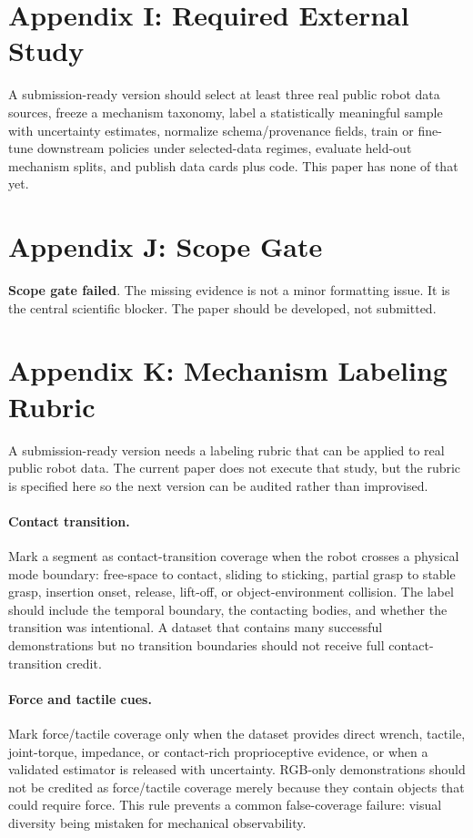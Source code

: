 \documentclass{article}
\newcommand{\todoexternal}{\textbf{Scope gate failed}}
\begin{document}
\section{Appendix I: Required External Study}
A submission-ready version should select at least three real public robot data sources, freeze a mechanism taxonomy, label a statistically meaningful sample with uncertainty estimates, normalize schema/provenance fields, train or fine-tune downstream policies under selected-data regimes, evaluate held-out mechanism splits, and publish data cards plus code. This paper has none of that yet.

\section{Appendix J: Scope Gate}
\todoexternal{}. The missing evidence is not a minor formatting issue. It is the central scientific blocker. The paper should be developed, not submitted.

\section{Appendix K: Mechanism Labeling Rubric}
A submission-ready version needs a labeling rubric that can be applied to real public robot data. The current paper does not execute that study, but the rubric is specified here so the next version can be audited rather than improvised.

\paragraph{Contact transition.}
Mark a segment as contact-transition coverage when the robot crosses a physical mode boundary: free-space to contact, sliding to sticking, partial grasp to stable grasp, insertion onset, release, lift-off, or object-environment collision. The label should include the temporal boundary, the contacting bodies, and whether the transition was intentional. A dataset that contains many successful demonstrations but no transition boundaries should not receive full contact-transition credit.

\paragraph{Force and tactile cues.}
Mark force/tactile coverage only when the dataset provides direct wrench, tactile, joint-torque, impedance, or contact-rich proprioceptive evidence, or when a validated estimator is released with uncertainty. RGB-only demonstrations should not be credited as force/tactile coverage merely because they contain objects that could require force. This rule prevents a common false-coverage failure: visual diversity being mistaken for mechanical observability.
\end{document}

